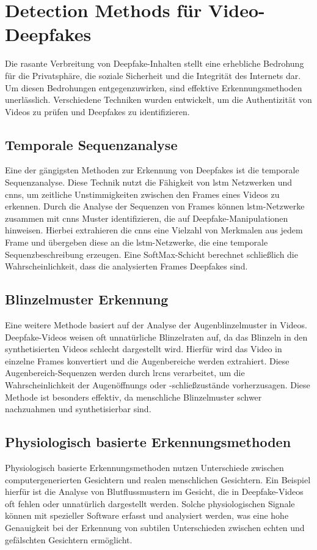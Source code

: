 \section{Detection Methods für Video-Deepfakes}\label{sec:detection-methods}
Die rasante Verbreitung von Deepfake-Inhalten stellt eine erhebliche Bedrohung für die Privatsphäre, die soziale Sicherheit und die Integrität des Internets dar.
Um diesen Bedrohungen entgegenzuwirken, sind effektive Erkennungsmethoden unerlässlich.
Verschiedene Techniken wurden entwickelt, um die Authentizität von Videos zu prüfen und Deepfakes zu identifizieren.

\subsection*{Temporale Sequenzanalyse}
Eine der gängigsten Methoden zur Erkennung von Deepfakes ist die temporale Sequenzanalyse.
Diese Technik nutzt die Fähigkeit von \gls{lstm} Netzwerken und \glspl{cnn}, um zeitliche Unstimmigkeiten zwischen den Frames eines Videos zu erkennen.
Durch die Analyse der Sequenzen von Frames können \gls{lstm}-Netzwerke zusammen mit \glspl{cnn} Muster identifizieren, die auf Deepfake-Manipulationen hinweisen.
Hierbei extrahieren die \glspl{cnn} eine Vielzahl von Merkmalen aus jedem Frame und übergeben diese an die \gls{lstm}-Netzwerke, die eine temporale Sequenzbeschreibung erzeugen.
Eine SoftMax-Schicht berechnet schließlich die Wahrscheinlichkeit, dass die analysierten Frames Deepfakes sind\cite{Deepfakes-An-Overview}.

\subsection*{Blinzelmuster Erkennung}
Eine weitere Methode basiert auf der Analyse der Augenblinzelmuster in Videos.
Deepfake-Videos weisen oft unnatürliche Blinzelraten auf, da das Blinzeln in den synthetisierten Videos schlecht dargestellt wird.
Hierfür wird das Video in einzelne Frames konvertiert und die Augenbereiche werden extrahiert.
Diese Augenbereich-Sequenzen werden durch \glspl{lrcn} verarbeitet, um die Wahrscheinlichkeit der Augenöffnungs oder -schließzustände vorherzusagen.
Diese Methode ist besonders effektiv, da menschliche Blinzelmuster schwer nachzuahmen und synthetisierbar sind\cite{Deepfakes-An-Overview}.

\subsection*{Physiologisch basierte Erkennungsmethoden}
Physiologisch basierte Erkennungsmethoden nutzen Unterschiede zwischen computergenerierten Gesichtern und realen menschlichen Gesichtern.
Ein Beispiel hierfür ist die Analyse von Blutflussmustern im Gesicht, die in Deepfake-Videos oft fehlen oder unnatürlich dargestellt werden.
Solche physiologischen Signale können mit spezieller Software erfasst und analysiert werden, was eine hohe Genauigkeit bei der Erkennung von subtilen Unterschieden zwischen echten und gefälschten Gesichtern ermöglicht\cite{The-Emergence-of-Deepfake-Technology}.

